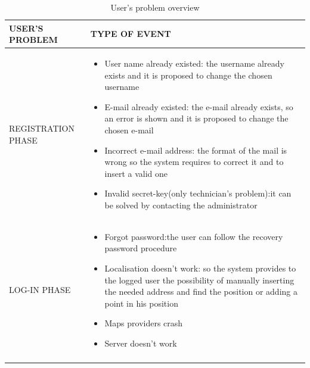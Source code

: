 \documentclass{article}
\begin{document}
\begin{longtable}{|l|p{}|}
    \hline
    USER'S PROBLEM      &         TYPE OF EVENT    
      \\
    \hline
      
      REGISTRATION PHASE  &        \begin{itemize}
                                   \item User name already existed: the username already exists and it is proposed to change the chosen username
                                   \item  E-mail already existed: the e-mail already exists, so an error is shown and it is proposed to change the chosen e-mail
                                   \item  Incorrect e-mail address: the format of the mail is wrong so the system requires to correct it and to insert a valid one
                                   
                                   \item Invalid secret-key(only technician's problem):it can be solved by contacting the administrator
                                   \end{itemize} 
                \\
    \hline
      LOG-IN PHASE &        \begin{itemize}
                            \item Forgot password:the user can follow the recovery password procedure
                            \item Localisation doesn’t work: so the system provides to the logged user the possibility of  manually inserting the needed address and find the position or adding a point in his position
                            \item Maps providers crash
                            \item Server doesn’t work
                            \end{itemize}
             \\
            \hline
\caption{User's problem overview} \\

\end{longtable}
\end{document}
